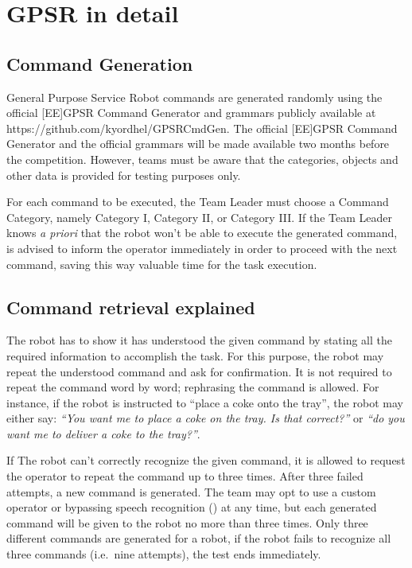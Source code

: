 \chapter{GPSR in detail}
\label{chap:gpsr-appendix}

\section{Command Generation}
General Purpose Service Robot commands are generated randomly using the official [EE]GPSR Command Generator and grammars publicly available at https://github.com/kyordhel/GPSRCmdGen. The official [EE]GPSR Command Generator and the official grammars will be made available two months before the competition. However, teams must be aware that the categories, objects and other data is provided for testing purposes only.

For each command to be executed, the Team Leader must choose a Command Category, namely Category I, Category II, or Category III. If the Team Leader knows \textit{a priori} that the robot won't be able to execute the generated command, is advised to inform the operator immediately in order to proceed with the next command, saving this way valuable time for the task execution.

\section{Command retrieval explained}
The robot has to show it has understood the given command by stating all the required information to accomplish the task. For this purpose, the robot may repeat the understood command and ask for confirmation. It is not required to repeat the command word by word; rephrasing the command is allowed. For instance, if the robot is instructed to \enquote{place a coke onto the tray}, the robot may either say: \textit{\enquote{You want me to place a coke on the tray. Is that correct?}} or \textit{\enquote{do you want me to deliver a coke to the tray?}}.

If The robot can't correctly recognize the given command, it is allowed to request the operator to repeat the command up to three times. After three failed attempts, a new command is generated. The team may opt to use a custom operator or bypassing speech recognition () at any time, but each generated command will be given to the robot no more than three times. Only three different commands are generated for a robot, if the robot fails to recognize all three commands (i.e.~nine attempts), the test ends immediately.

